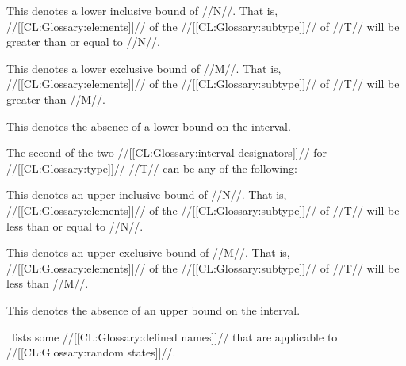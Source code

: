 \beginlist


This denotes a lower inclusive bound of //N//.  That is, //[[CL:Glossary:elements]]// of the //[[CL:Glossary:subtype]]// of //T// will be greater than or equal to //N//.


This denotes a lower exclusive bound of //M//.  That is, //[[CL:Glossary:elements]]// of the //[[CL:Glossary:subtype]]// of //T// will be greater than //M//.


This denotes the absence of a lower bound on the interval.

\endlist

The second of the two //[[CL:Glossary:interval designators]]// for //[[CL:Glossary:type]]// //T// can be any of the following:

\beginlist


This denotes an upper inclusive bound of //N//.  That is, //[[CL:Glossary:elements]]// of the //[[CL:Glossary:subtype]]// of //T// will be less than or equal to //N//.


This denotes an upper exclusive bound of //M//.  That is, //[[CL:Glossary:elements]]// of the //[[CL:Glossary:subtype]]// of //T// will be less than //M//.


This denotes the absence of an upper bound on the interval.

\endlist

\endsubsection%


\Thenextfigure\ lists some //[[CL:Glossary:defined names]]// that are applicable to //[[CL:Glossary:random states]]//.


\endsubsection%
